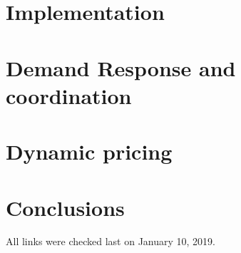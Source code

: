 \documentclass[12pt]{scrartcl}
\begin{document}
\section{Implementation}\label{sec:Implementation}


\section{Demand Response and coordination}\label{sec:DemandResponse}


\section{Dynamic pricing}\label{sec:DynamicPricing }


\section{Conclusions}


\printbibliography
%
%
All links were checked last on January 10, 2019.
\end{document}
